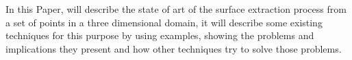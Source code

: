 %
In this Paper, will describe the state of art of the surface extraction process from a set of 
points in a three dimensional domain, it will describe some existing techniques for this purpose 
by using examples, showing the problems and implications they present and how other techniques 
try to solve those problems.

